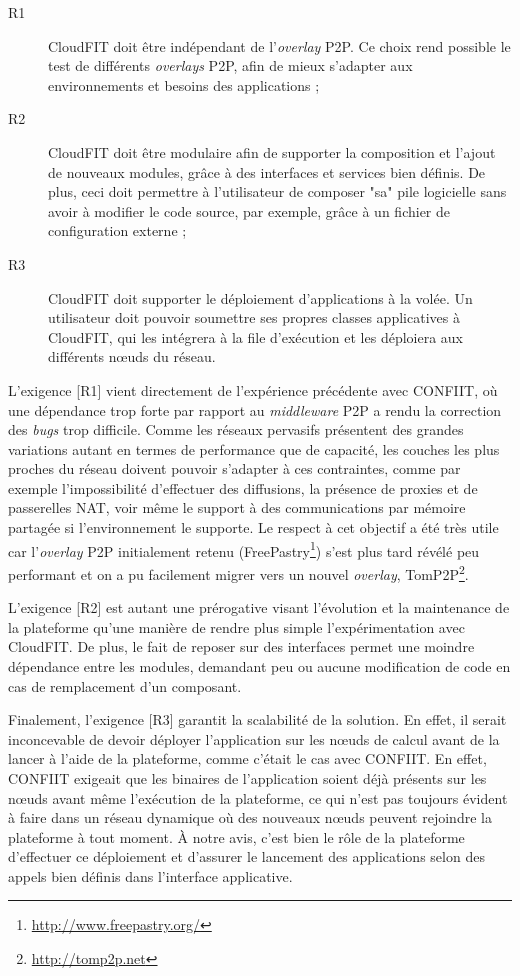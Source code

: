\begin{description}
	\item [R1] CloudFIT doit être indépendant de l'\textit{overlay} P2P. Ce choix rend possible le test de différents \textit{overlays} P2P, afin de mieux s'adapter aux environnements et besoins des applications ;
	\item [R2] CloudFIT doit être modulaire afin de supporter la composition et l'ajout de nouveaux modules, grâce à des interfaces et services bien définis. De plus, ceci doit permettre à l'utilisateur de composer "sa" pile logicielle sans avoir à modifier le code source, par exemple, grâce à un fichier de configuration externe ;
	\item [R3] CloudFIT doit supporter le déploiement d'applications à la volée. Un utilisateur doit pouvoir soumettre ses propres classes applicatives à CloudFIT, qui les intégrera à la file d'exécution et les déploiera aux différents n{\oe}uds du réseau.
\end{description} 


L'exigence [R1] vient directement de l'expérience précédente avec CONFIIT, où une dépendance trop forte par rapport au \textit{middleware} P2P a rendu la correction des \textit{bugs} trop difficile.  Comme les réseaux pervasifs présentent des grandes variations autant en termes de performance que de capacité, les couches les plus proches du réseau doivent pouvoir s'adapter à ces contraintes, comme par exemple l'impossibilité d'effectuer des diffusions, la présence de proxies et de passerelles NAT, voir même le support à des communications par mémoire partagée si l'environnement le supporte. Le respect à cet objectif a été très utile car l'\textit{overlay} P2P initialement retenu (FreePastry\footnote{\url{http://www.freepastry.org/}}) s'est plus tard révélé peu performant et on a pu facilement migrer vers un nouvel \textit{overlay}, TomP2P\footnote{\url{http://tomp2p.net}}. 

L'exigence [R2] est autant une prérogative visant l'évolution et la maintenance de la plateforme qu'une manière de rendre plus simple l'expérimentation avec CloudFIT. De plus, le fait de reposer sur des interfaces permet une moindre dépendance entre les modules, demandant peu ou aucune modification de code en cas de remplacement d'un composant. 

Finalement, l'exigence [R3] garantit la scalabilité de la solution. En effet, il serait inconcevable de devoir déployer l’application sur les n{\oe}uds de calcul avant de la lancer à l’aide de la plateforme, comme c’était le cas avec CONFIIT. En effet, CONFIIT exigeait que les binaires de l’application soient déjà présents sur les n{\oe}uds avant même l’exécution de la plateforme, ce qui n'est pas toujours évident à faire dans un réseau dynamique où des nouveaux n{\oe}uds peuvent rejoindre la plateforme à tout moment. À notre avis, c'est bien le rôle de la plateforme d'effectuer ce déploiement et d'assurer le lancement des applications selon des appels bien définis dans l'interface applicative. 


